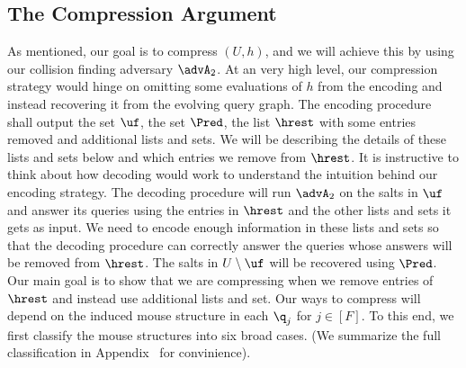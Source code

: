 \subsection{The Compression Argument} \label{sec:compression}
As mentioned, our goal is to compress $(U,h)$, and we will achieve this by using our collision finding adversary $\advA_2$. At an very high level, our compression strategy would hinge on omitting some evaluations of $h$ from the encoding and instead recovering it from the evolving query graph.
 The encoding procedure shall output the set $\uf$, the set $\Pred$, the list $\hrest$ with some entries removed and additional lists and sets. We will be describing the details of these lists and sets below and which entries we remove from $\hrest$.
\ifnum{}
It is instructive to think about how decoding would work to understand the intuition behind our encoding strategy. The decoding procedure will run $\advA_2$ on the salts in $\uf$ and answer its queries using the entries in $\hrest$ and the other lists and sets it gets as input. We need to encode enough information in these lists and sets so that the decoding procedure can correctly answer the queries whose answers will be removed from $\hrest$. The salts in $U \setminus \uf$ will be recovered using $\Pred$.
\fi
Our main goal is to show that we are compressing when we remove entries of $\hrest$ and instead use additional lists and set. Our ways to compress will depend on the induced mouse structure in each $\q_j$ for $j\in[F]$. To this end, we first classify the mouse structures into six broad cases. (We summarize the full classification in Appendix~ for convinience).
%
